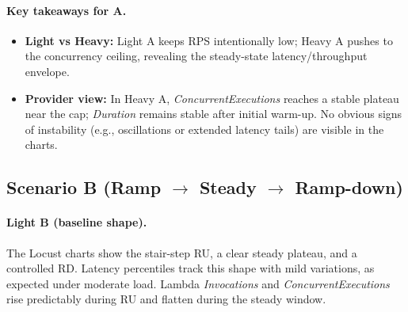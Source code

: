 \documentclass[11pt,a4paper]{article}
\begin{document}



\paragraph{Key takeaways for A.}
\begin{itemize}
  \item \textbf{Light vs Heavy:} Light A keeps RPS intentionally low; Heavy A pushes to the concurrency ceiling, revealing the steady-state latency/throughput envelope.
  \item \textbf{Provider view:} In Heavy A, \emph{ConcurrentExecutions} reaches a stable plateau near the cap; \emph{Duration} remains stable after initial warm-up. No obvious signs of instability (e.g., oscillations or extended latency tails) are visible in the charts.
\end{itemize}

\subsection{Scenario B (Ramp $\rightarrow$ Steady $\rightarrow$ Ramp-down)}\label{subsec:resB}

\paragraph{Light B (baseline shape).}
The Locust charts show the stair-step RU, a clear steady plateau, and a controlled RD. Latency percentiles track this shape with mild variations, as expected under moderate load. Lambda \emph{Invocations} and \emph{ConcurrentExecutions} rise predictably during RU and flatten during the steady window.
\end{document}
